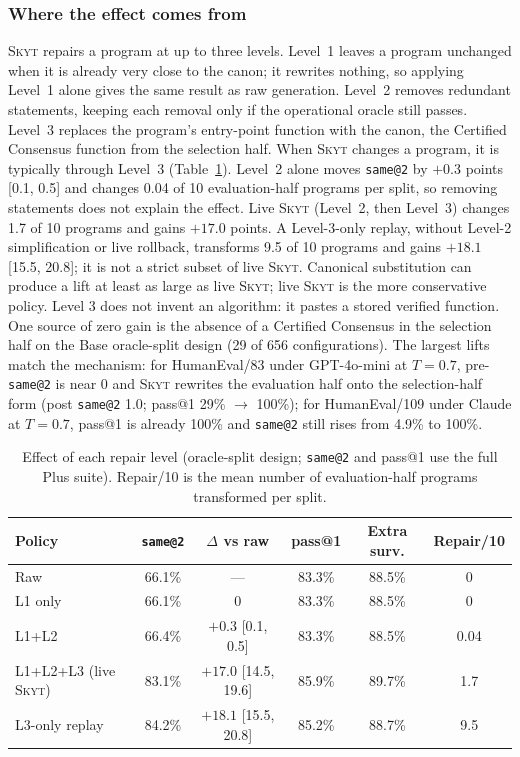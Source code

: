 \documentclass[acmsmall,screen,review,anonymous]{acmart}
\makeatletter
\newcommand{\skyt}{\textsc{Skyt}}
\newcommand{\sameat}{\mbox{\texttt{same@2}}}
\makeatother
\begin{document}
\subsubsection{Where the effect comes from}
\label{sec:rq4-mechanism}
\skyt{} repairs a program at up to three levels.
Level~1 leaves a program unchanged when it is already very close to the
canon; it rewrites nothing, so applying Level~1 alone gives the same result
as raw generation.
Level~2 removes redundant statements, keeping each removal only if the
operational oracle still passes.
Level~3 replaces the program's entry-point function with the canon, the
Certified Consensus function from the selection half.
When \skyt{} changes a program, it is typically through Level~3
(Table~\ref{tab:level-ablation}).
Level~2 alone moves \sameat{} by $+0.3$ points [0.1, 0.5] and changes 0.04
of 10 evaluation-half programs per split, so removing statements does not
explain the effect.
Live \skyt{} (Level~2, then Level~3) changes 1.7 of 10 programs and gains
$+17.0$ points.
A Level-3-only replay, without Level-2 simplification or live rollback,
transforms 9.5 of 10 programs and gains $+18.1$ [15.5, 20.8]; it is not a strict
subset of live \skyt{}.
Canonical substitution can produce a lift at least as large as live \skyt{};
live \skyt{} is the more conservative policy.
Level 3 does not invent an algorithm: it pastes a stored verified function.
One source of zero gain is the absence of a Certified Consensus in the selection half on the Base oracle-split design (29 of 656 configurations).
The largest lifts match the mechanism: for HumanEval/83 under GPT-4o-mini at
$T{=}0.7$, pre-\sameat{} is near 0 and \skyt{} rewrites the evaluation half onto the
selection-half form (post \sameat{} 1.0; pass@1 29\% $\to$ 100\%); for HumanEval/109
under Claude at $T{=}0.7$, pass@1 is already 100\% and \sameat{} still rises
from 4.9\% to 100\%.

\begin{table}[t]
  \small
  \setlength{\tabcolsep}{4pt}
  \caption{Effect of each repair level (oracle-split design; \sameat{} and pass@1 use the
    full Plus suite).
    Repair/10 is the mean number of evaluation-half programs transformed per split.}
  \label{tab:level-ablation}
  \begin{tabular}{lccccc}
    \toprule
    Policy & \sameat{} & $\Delta$ vs raw & pass@1 & Extra surv. & Repair/10 \\
    \midrule
    Raw & 66.1\% & --- & 83.3\% & 88.5\% & 0 \\
    L1 only & 66.1\% & 0 & 83.3\% & 88.5\% & 0 \\
    L1+L2 & 66.4\% & $+0.3$ [0.1, 0.5] & 83.3\% & 88.5\% & 0.04 \\
    L1+L2+L3 (live \skyt{}) & 83.1\% & $+17.0$ [14.5, 19.6] & 85.9\% & 89.7\% & 1.7 \\
    L3-only replay & 84.2\% & $+18.1$ [15.5, 20.8] & 85.2\% & 88.7\% & 9.5 \\
    \bottomrule
  \end{tabular}
\end{table}
\end{document}
